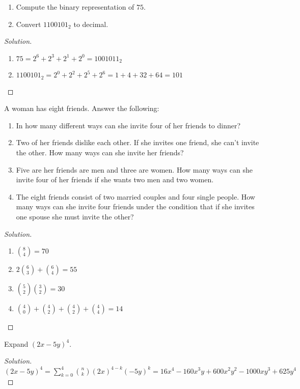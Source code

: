         \begin{problem}
        \par
        \begin{enumerate}
            \item Compute the binary representation of $75$.
            \item Convert $1100101_2$ to decimal.
        \end{enumerate}
        \end{problem}
        \begin{proof}[Solution]
        \par
        \begin{enumerate}
            \item $75=2^{6}+2^{3}+2^{1}+2^{0}=1001011_{2}$
            \item $1100101_{2}=2^{0}+2^{2}+2^{5}+2^{6}=1+4+32+64=101$
        \end{enumerate}
        \end{proof}
        \begin{problem}
        A woman has eight friends. Answer the following:
        \begin{enumerate}
            \item In how many different ways can she invite four of her friends to dinner?
            \item Two of her friends dislike each other. If she invites one friend, she can't invite the other. How many ways can she invite her friends?
            \item Five are her friends are men and three are women. How many ways can she invite four of her friends if she wants two men and two women.
            \item The eight friends consist of two married couples and four single people. How many ways can she invite four friends under the condition that if she invites one spouse she must invite the other?
        \end{enumerate}
        \end{problem}
        \begin{proof}[Solution]
        \vspace{-\topsep}
        \
        \begin{enumerate}
            \item $\binom{8}{4} = 70$
            \item $2\binom{6}{3}+\binom{6}{4}=55$
            \item $\binom{5}{2}\binom{3}{2} = 30$
            \item $\binom{4}{0}+\binom{4}{2}+\binom{4}{2}+\binom{4}{4}=14$
        \end{enumerate}
        \end{proof}
        \begin{problem}
        Expand $(2x-5y)^4$.
        \end{problem}
        \begin{proof}[Solution]
        \vspace{-0.5\topsep}
        $(2x-5y)^4=\sum_{k=0}^{4}\binom{n}{k}(2x)^{4-k}(-5y)^{k}=16x^4-160x^3y+600x^2y^2-1000xy^3+625y^4$
        \end{proof}

